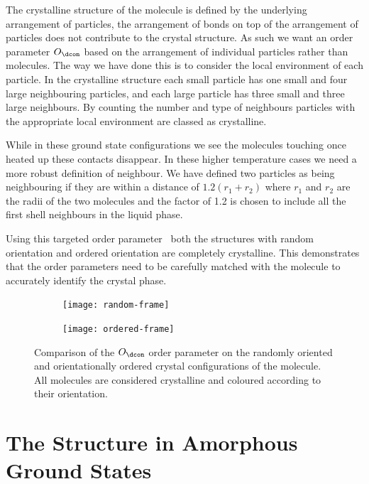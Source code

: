 The crystalline structure of the \dcon molecule is defined by the underlying arrangement of particles, the arrangement of bonds on top of the arrangement of particles does not contribute to the crystal structure. As such we want an order parameter $O_\dcon$ based on the arrangement of individual particles rather than molecules. The way we have done this is to consider the local environment of each particle. In the crystalline structure each small particle has one small and four large neighbouring particles, and each large particle has three small and three large neighbours. By counting the number and type of neighbours particles with the appropriate local environment are classed as crystalline. 

While in these ground state configurations we see the molecules touching once heated up these contacts disappear. In these higher temperature cases we need a more robust definition of neighbour. We have defined two particles as being neighbouring if they are within a distance of $1.2(r_1 +r_2)$ where $r_1$ and $r_2$ are the radii of the two molecules and the factor of 1.2 is chosen to include all the first shell neighbours in the liquid phase.

Using this targeted order parameter~ both the structures with random orientation and ordered orientation are completely crystalline. This demonstrates that the order parameters need to be carefully matched with the molecule to accurately identify the crystal phase.

\begin{figure}
    \begin{subfigure}[t]{0.5\linewidth}
        \texttt{[image: random-frame]}
        \caption{}
        \label{fig:random frame}
    \end{subfigure}
    \begin{subfigure}[t]{0.5\linewidth}
        \texttt{[image: ordered-frame]}
        \caption{}
        \label{fig:ordered frame}
    \end{subfigure}
    \caption{Comparison of the $O_\dcon$ order parameter on the randomly oriented  and orientationally ordered  crystal configurations of the \dcon molecule. All molecules are considered crystalline and coloured according to their orientation.}
    \label{fig:compact frame}
\end{figure}

\section{The Structure in Amorphous Ground States}

